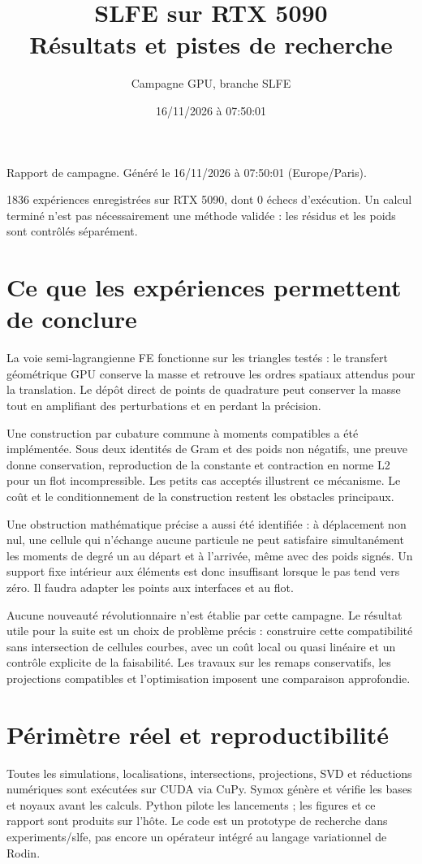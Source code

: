\documentclass[10pt,a4paper]{article}
\title{SLFE sur RTX 5090\\Résultats et pistes de recherche}
\author{Campagne GPU, branche SLFE}
\date{16/11/2026 à 07:50:01}
\begin{document}
\maketitle\tableofcontents
Rapport de campagne. Généré le 16/11/2026 à 07:50:01 (Europe/Paris).

1836 expériences enregistrées sur RTX 5090, dont 0 échecs d'exécution. Un calcul terminé n'est pas nécessairement une méthode validée : les résidus et les poids sont contrôlés séparément.

\section{Ce que les expériences permettent de conclure}
La voie semi-lagrangienne FE fonctionne sur les triangles testés : le transfert géométrique GPU conserve la masse et retrouve les ordres spatiaux attendus pour la translation. Le dépôt direct de points de quadrature peut conserver la masse tout en amplifiant des perturbations et en perdant la précision.

Une construction par cubature commune à moments compatibles a été implémentée. Sous deux identités de Gram et des poids non négatifs, une preuve donne conservation, reproduction de la constante et contraction en norme L2 pour un flot incompressible. Les petits cas acceptés illustrent ce mécanisme. Le coût et le conditionnement de la construction restent les obstacles principaux.

Une obstruction mathématique précise a aussi été identifiée : à déplacement non nul, une cellule qui n'échange aucune particule ne peut satisfaire simultanément les moments de degré un au départ et à l'arrivée, même avec des poids signés. Un support fixe intérieur aux éléments est donc insuffisant lorsque le pas tend vers zéro. Il faudra adapter les points aux interfaces et au flot.

Aucune nouveauté révolutionnaire n'est établie par cette campagne. Le résultat utile pour la suite est un choix de problème précis : construire cette compatibilité sans intersection de cellules courbes, avec un coût local ou quasi linéaire et un contrôle explicite de la faisabilité. Les travaux sur les remaps conservatifs, les projections compatibles et l'optimisation imposent une comparaison approfondie.

\section{Périmètre réel et reproductibilité}
Toutes les simulations, localisations, intersections, projections, SVD et réductions numériques sont exécutées sur CUDA via CuPy. Symox génère et vérifie les bases et noyaux avant les calculs. Python pilote les lancements ; les figures et ce rapport sont produits sur l'hôte. Le code est un prototype de recherche dans experiments/slfe, pas encore un opérateur intégré au langage variationnel de Rodin.
\end{document}
